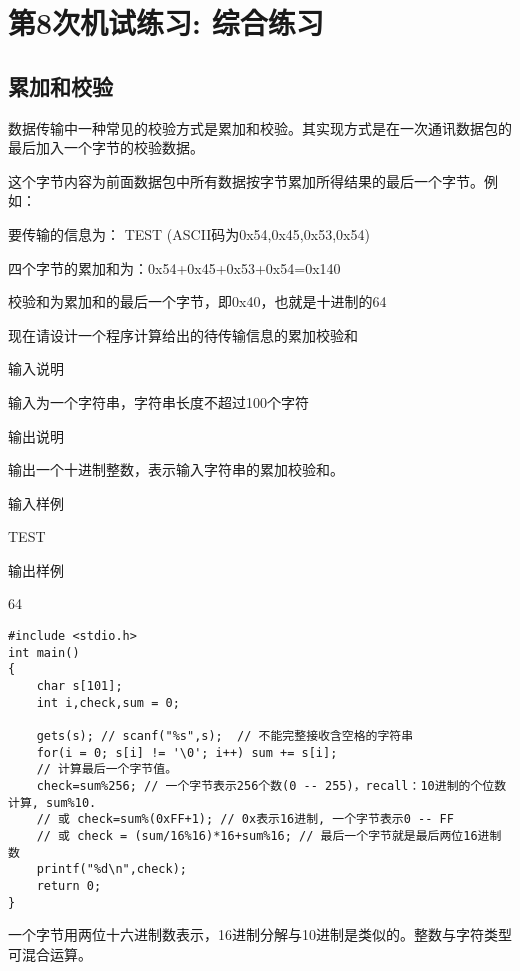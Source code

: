 %
%
%
\chapter{第8次机试练习: 综合练习} %

\section{累加和校验}
数据传输中一种常见的校验方式是累加和校验。其实现方式是在一次通讯数据包的最后加入一个字节的校验数据。

这个字节内容为前面数据包中所有数据按字节累加所得结果的最后一个字节。例如： 

要传输的信息为： TEST (ASCII码为0x54,0x45,0x53,0x54)

四个字节的累加和为：0x54+0x45+0x53+0x54=0x140 

校验和为累加和的最后一个字节，即0x40，也就是十进制的64 

现在请设计一个程序计算给出的待传输信息的累加校验和 

输入说明

输入为一个字符串，字符串长度不超过100个字符

输出说明

输出一个十进制整数，表示输入字符串的累加校验和。

输入样例

TEST

输出样例

64

\begin{lstlisting}
#include <stdio.h>
int main()
{
	char s[101];
	int i,check,sum = 0; 
	
	gets(s); // scanf("%s",s);  // 不能完整接收含空格的字符串 
	for(i = 0; s[i] != '\0'; i++) sum += s[i];
	// 计算最后一个字节值。
	check=sum%256; // 一个字节表示256个数(0 -- 255)，recall：10进制的个位数计算, sum%10. 
	// 或 check=sum%(0xFF+1); // 0x表示16进制, 一个字节表示0 -- FF 
	// 或 check = (sum/16%16)*16+sum%16; // 最后一个字节就是最后两位16进制数 
	printf("%d\n",check);
	return 0;
}
\end{lstlisting}

\begin{note}[要点]
	一个字节用两位十六进制数表示，16进制分解与10进制是类似的。整数与字符类型可混合运算。
\end{note}

